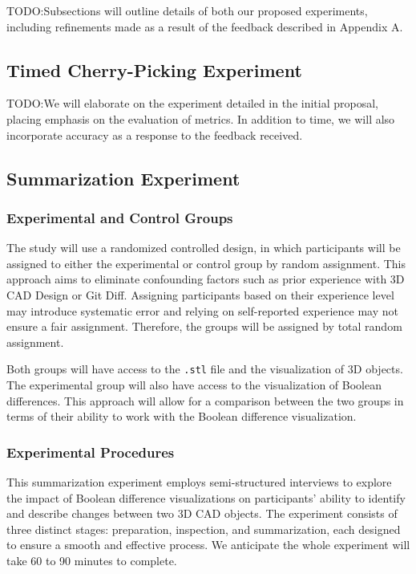 \documentclass[sigconf,authorversion,nonacm]{acmart}
\begin{document}
TODO:Subsections will outline details of both our proposed experiments, including refinements made as a result of the feedback described in Appendix A.

\subsection{Timed Cherry-Picking Experiment}

TODO:We will elaborate on the experiment detailed in the initial proposal, placing emphasis on the evaluation of metrics. In addition to time, we will also incorporate accuracy as a response to the feedback received.

\subsection{Summarization Experiment}
\subsubsection{Experimental and Control Groups}

The study will use a randomized controlled design, in which participants will be assigned to either the experimental or control group by random assignment. This approach aims to eliminate confounding factors such as prior experience with 3D CAD Design or Git Diff. Assigning participants based on their experience level may introduce systematic error and relying on self-reported experience may not ensure a fair assignment. Therefore, the groups will be assigned by total random assignment.

Both groups will have access to the \texttt{.stl} file and the visualization of 3D objects. The experimental group will also have access to the visualization of Boolean differences. This approach will allow for a comparison between the two groups in terms of their ability to work with the Boolean difference visualization.
\subsubsection{Experimental Procedures}
This summarization experiment employs semi-structured interviews to explore the impact of Boolean difference visualizations on participants' ability to identify and describe changes between two 3D CAD objects. 
The experiment consists of three distinct stages: preparation, inspection, and summarization, each designed to ensure a smooth and effective process. We anticipate the whole experiment will take 60 to 90 minutes to complete.
\end{document}
